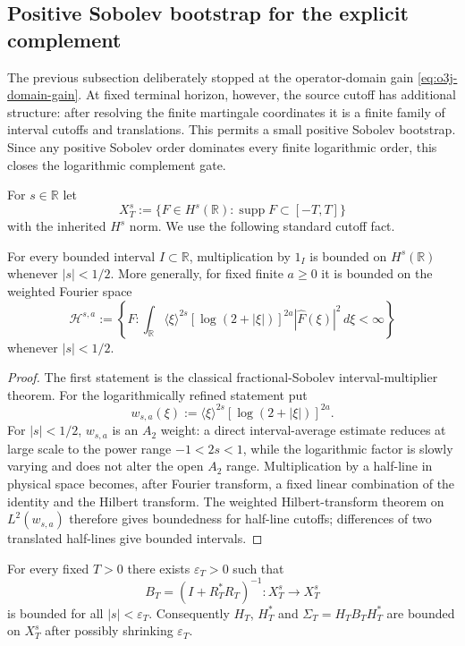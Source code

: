 
\subsection{Positive Sobolev bootstrap for the explicit complement}\label{subsec:o3k-log-complement}

The previous subsection deliberately stopped at the operator-domain gain
\eqref{eq:o3j-domain-gain}.  At fixed terminal horizon, however, the source cutoff has
additional structure: after resolving the finite martingale coordinates it is a finite
family of interval cutoffs and translations.  This permits a small positive Sobolev
bootstrap.  Since any positive Sobolev order dominates every finite logarithmic order,
this closes the logarithmic complement gate.

For $s\in\mathbb R$ let
\[
 X_T^s:=\{F\in H^s(\mathbb R):\operatorname{supp}F\subset[-T,T]\}
\]
with the inherited $H^s$ norm.  We use the following standard cutoff fact.

\begin{lemma}\label{lem:o3k-cutoff}
For every bounded interval $I\subset\mathbb R$, multiplication by $1_I$ is bounded on
$H^s(\mathbb R)$ whenever $|s|<1/2$.  More generally, for fixed finite $a\ge0$ it is
bounded on the weighted Fourier space
\[
 \mathcal H^{s,a}
 :=\left\{F:\int_{\mathbb R}
 \langle\xi\rangle^{2s}[\log(2+|\xi|)]^{2a}
 |\widehat F(\xi)|^2\,d\xi<\infty\right\}
\]
whenever $|s|<1/2$.
\end{lemma}

\begin{proof}
The first statement is the classical fractional-Sobolev interval-multiplier theorem.
For the logarithmically refined statement put
\[
 w_{s,a}(\xi):=\langle\xi\rangle^{2s}[\log(2+|\xi|)]^{2a}.
\]
For $|s|<1/2$, $w_{s,a}$ is an $A_2$ weight: a direct interval-average estimate reduces
at large scale to the power range $-1<2s<1$, while the logarithmic factor is slowly
varying and does not alter the open $A_2$ range.  Multiplication by a half-line in
physical space becomes, after Fourier transform, a fixed linear combination of the
identity and the Hilbert transform.  The weighted Hilbert-transform theorem on
$L^2(w_{s,a})$ therefore gives boundedness for half-line cutoffs; differences of two
translated half-lines give bounded intervals.
\end{proof}

\begin{lemma}\label{lem:o3k-schur-window}
For every fixed $T>0$ there exists $\varepsilon_T>0$ such that
\[
 B_T=(I+R_T^*R_T)^{-1}:X_T^s\longrightarrow X_T^s
\]
is bounded for all $|s|<\varepsilon_T$.  Consequently $H_T$, $H_T^*$ and
$\Sigma_T=H_TB_TH_T^*$ are bounded on $X_T^s$ after possibly shrinking
$\varepsilon_T$.
\end{lemma}

